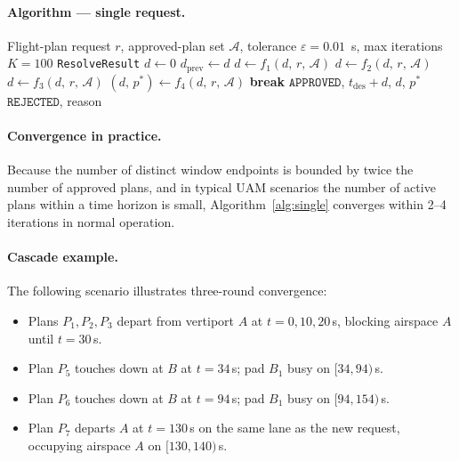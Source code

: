 \documentclass[12pt,a4paper]{article}
\begin{document}
\paragraph{Algorithm — single request.}

\begin{algorithm}[H]
\caption{Single-Request Conflict Resolution}
\label{alg:single}
\begin{algorithmic}[1]
\Require Flight-plan request $r$, approved-plan set $\mathcal{A}$, tolerance
  $\varepsilon = 0.01$~s, max iterations $K = 100$
\Ensure \texttt{ResolveResult}
\State $d \gets 0$
  \State $d_{\mathrm{prev}} \gets d$
  \State $d \gets f_1(d,\,r,\,\mathcal{A})$ 
  \State $d \gets f_2(d,\,r,\,\mathcal{A})$ 
  \State $d \gets f_3(d,\,r,\,\mathcal{A})$ 
  \State $(d,\, p^*) \gets f_4(d,\,r,\,\mathcal{A})$ 
   \textbf{break} \EndIf
\EndFor
{}
  \Return $\texttt{APPROVED}$, $t_{\mathrm{des}} + d$, $d$, $p^*$
\Else
  \Return $\texttt{REJECTED}$, reason
\EndIf
\end{algorithmic}
\end{algorithm}

\paragraph{Convergence in practice.}
Because the number of distinct window endpoints is bounded by twice the number
of approved plans, and in typical UAM scenarios the number of active plans
within a time horizon is small, Algorithm~\ref{alg:single} converges within
2--4 iterations in normal operation.

\paragraph{Cascade example.}
The following scenario illustrates three-round convergence:

\begin{itemize}
  \item Plans $P_1, P_2, P_3$ depart from vertiport $A$ at $t=0, 10, 20$\,s,
    blocking airspace $A$ until $t=30$\,s.
  \item Plan $P_5$ touches down at $B$ at $t=34$\,s; pad $B_1$ busy on
    $[34, 94)$\,s.
  \item Plan $P_6$ touches down at $B$ at $t=94$\,s; pad $B_1$ busy on
    $[94, 154)$\,s.
  \item Plan $P_7$ departs $A$ at $t=130$\,s on the same lane as the new
    request, occupying airspace $A$ on $[130, 140)$\,s.
\end{itemize}
\end{document}
